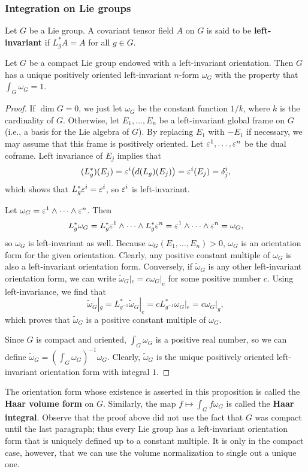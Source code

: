 \subsubsection{Integration on Lie groups}
Let $G$ be a Lie group. A covariant tensor field $A$ on $G$ is said to be \textbf{left-invariant} if $L_g^*A=A$ for all $g\in G$.
\begin{proposition}
Let $G$ be a compact Lie group endowed with a left-invariant orientation. Then $G$ has a unique positively oriented left-invariant $n$-form $\omega_G$ with the property that $\int_G\omega_G=1$.
\end{proposition}
\begin{proof}
If $\dim G=0$, we just let $\omega_G$ be the constant function $1/k$, where $k$ is the
cardinality of $G$. Otherwise, let $E_1,\dots,E_n$ be a left-invariant global frame on $G$ (i.e., a basis for the Lie algebra of $G$). By replacing $E_1$ with $-E_1$ if necessary, we may assume that this frame is positively oriented. Let $\varepsilon^1,\dots,\varepsilon^n$ be the dual coframe. Left invariance of $E_j$ implies that
\[(L_g^*)(E_j)=\varepsilon^i\big(d(L_g)(E_j)\big)=\varepsilon^i(E_j)=\delta^i_j,\]
which shows that $L_g^*\varepsilon^i=\varepsilon^i$, so $\varepsilon^i$ is left-invariant.\par
Let $\omega_G=\varepsilon^1\wedge\cdots\wedge\varepsilon^n$. Then
\[L_g^*\omega_G=L_g^*\varepsilon^1\wedge\cdots\wedge L_g^*\varepsilon^n=\varepsilon^1\wedge\cdots\wedge\varepsilon^n=\omega_G,\]
so $\omega_G$ is left-invariant as well. Because $\omega_G(E_1,\dots,E_n)>0$, $\omega_G$ is an orientation form for the given orientation. Clearly, any positive constant multiple of $\omega_G$ is also a left-invariant orientation form. Conversely, if $\widetilde{\omega}_G$ is any other left-invariant orientation form, we can write $\widetilde{\omega}_G|_e=c\omega_G|_e$ for some positive number $c$. Using left-invariance, we find that
\[\widetilde{\omega}_G|_g=L_{g^{-1}}^*\widetilde{\omega}_G|_e=cL_{g^{-1}}^*\omega_G|_e=c\omega_G|_g,\]
which proves that $\widetilde{\omega}_G$ is a positive constant multiple of $\omega_G$.\par
Since $G$ is compact and oriented, $\int_G\omega_G$ is a positive real number, so we can define $\widetilde{\omega}_G=(\int_G\omega_G)^{-1}\omega_G$. Clearly, $\widetilde{\omega}_G$ is the unique positively oriented left-invariant orientation form with integral $1$.
\end{proof}
\begin{remark}
The orientation form whose existence is asserted in this proposition is called the \textbf{Haar volume form} on $G$. Similarly, the map $f\mapsto\int_Gf\omega_G$ is called the \textbf{Haar integral}. Observe that the proof above did not use the fact that $G$ was compact until the last paragraph; thus every Lie group has a left-invariant orientation form that is uniquely defined up to a constant multiple. It is only in the compact case, however, that we can use the volume normalization to single out a unique one.
\end{remark}
